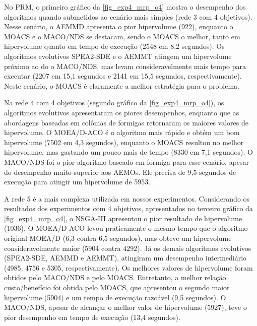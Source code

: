 No PRM, o primeiro gráfico da \autoref{fig_exp4_mrp_o4} mostra o desempenho dos algoritmos quando submetidos ao cenário mais simples (rede 3 com 4 objetivos). Nesse cenário, o AEMMD apresenta o pior hipervolume (922), enquanto o MOACS e o MACO/NDS se destacam, sendo o MOACS o melhor, tanto em hipervolume quanto em tempo de execução (2548 em 8,2 segundos). Os algoritmos evolutivos SPEA2-SDE e o AEMMT atingem um hipervolume próximo ao do o MACO/NDS, mas levam consideravelmente mais tempo para executar (2207 em 15,1 segundos e 2141 em 15,5 segundos, respectivamente). Neste cenário, o MOACS é claramente a melhor estratégia para o problema.

Na rede 4 com 4 objetivos (segundo gráfico da \autoref{fig_exp4_mrp_o4}), os algoritmos evolutivos apresentaram os piores desempenhos, enquanto que as abordagens baseadas em colônias de formigas retornaram os maiores valores de hipervolume. O MOEA/D-ACO é o algoritmo mais rápido e obtém um bom hipervolume (7502 em 4,3 segundos), enquanto o MOACS resultou no melhor hipervolume, mas gastando um pouco mais de tempo (8330 em 7,1 segundos). O MACO/NDS foi o pior algoritmo baseado em formiga para esse cenário, apesar do desempenho muito superior aos AEMOs. Ele precisa de 9,5 segundos de execução para atingir um hipervolume de 5953.

A rede 5 é a mais complexa utilizada em nossos experimentos. Considerando os resultados dos experimentos com 4 objetivos, apresentados no terceiro gráfico da \autoref{fig_exp4_mrp_o4}, o NSGA-III apresentou o pior resultado de hipervolume (1036). O MOEA/D-ACO levou praticamente o mesmo tempo que o algoritmo original MOEA/D (6,3 contra 6,5 segundos), mas obteve um hipervolume consideravelmente maior (5904 contra 4292). Já os demais algoritmos evolutivos (SPEA2-SDE, AEMMD e AEMMT), atingiram um desempenho intermediário (4985, 4756 e 5305, respectivamente). Os melhores valores de hipervolume foram obtidos pelo MACO/NDS e pelo MOACS. Entretanto, a melhor relação custo/benefício foi obtida pelo MOACS, que apresentou o segundo maior hipervolume (5904) e um tempo de execução razoável (9,5 segundos). O MACO/NDS, apesar de alcançar o melhor valor de hipervolume (5927), teve o pior desempenho em tempo de execução (13,4 segundos).

